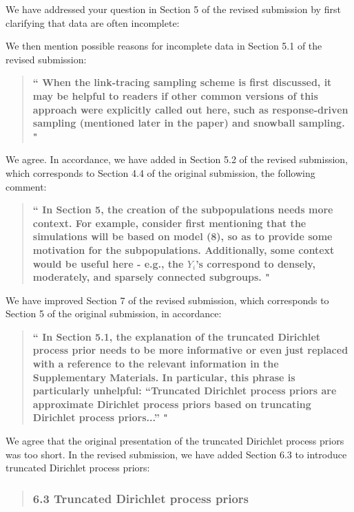 \documentclass[12pt]{article}
\renewcommand{\=}{&=&}
\renewcommand{\bbq}{\vspace{.05cm}\begin{quote}\bf``}
\renewcommand{\ebq}{\hspace{-.15cm}"\end{quote}}
\newcommand{\bauthq}{\vspace{.05cm}\begin{quote}\em}
\newcommand{\eauthq}{\hspace{-.25cm}\end{quote}}
\renewcommand{\=}{&=&}
\begin{document}
We have addressed your question in Section 5 of the revised submission by first clarifying that data are often incomplete:
\bauthq\eauthq
We then mention possible reasons for incomplete data in Section 5.1 of the revised submission:
\bauthq\eauthq

\vspace{-.5cm}

\bbq
When the link-tracing sampling scheme is first discussed, it may be helpful to readers if other common versions of this approach were explicitly called out here, such as response-driven sampling (mentioned later in the paper) and snowball sampling.
\ebq

We agree.
In accordance,
we have added in Section 5.2 of the revised submission,
which corresponds to Section 4.4 of the original submission,
the following comment:
\bauthq\eauthq

\vspace{-.25cm}

\bbq
In Section 5, the creation of the subpopulations needs more context. For example, consider first mentioning that the simulations will be based on model (8), so as to provide some motivation for the subpopulations. Additionally, some context would be useful here - e.g., the $Y_i$’s correspond to densely, moderately, and sparsely connected subgroups.
\ebq

We have improved Section 7 of the revised submission,
which corresponds to Section 5 of the original submission,
in accordance:
\bauthq\eauthq

\vspace{-.25cm}

\bbq
In Section 5.1, the explanation of the truncated Dirichlet process prior needs to be more informative or even just replaced with a reference to the relevant information in the Supplementary Materials. In particular, this phrase is particularly unhelpful: “Truncated Dirichlet process priors are approximate Dirichlet process priors based on truncating Dirichlet process priors...”
\ebq

We agree that the original presentation of the truncated Dirichlet process priors was too short.
In the revised submission,
we have added Section 6.3 to introduce truncated Dirichlet process priors:

\vspace{-.25cm}

\bauthq\subsubsection*{6.3 Truncated Dirichlet process priors}\eauthq
\end{document}
